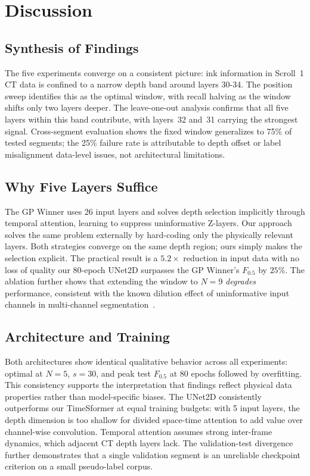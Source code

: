 \section{Discussion}
\label{sec:discussion}

\subsection{Synthesis of Findings}

The five experiments converge on a consistent picture: ink information in Scroll~1 CT data is confined to a narrow depth band around layers 30-34. The position sweep identifies this as the optimal window, with recall halving as the window shifts only two layers deeper. The leave-one-out analysis confirms that all five layers within this band contribute, with layers~32 and~31 carrying the strongest signal. Cross-segment evaluation shows the fixed window generalizes to 75\% of tested segments; the 25\% failure rate is attributable to depth offset or label misalignment data-level issues, not architectural limitations.

\subsection{Why Five Layers Suffice}

The GP Winner uses 26 input layers and solves depth selection implicitly through temporal attention, learning to suppress uninformative Z-layers. Our approach solves the same problem externally by hard-coding only the physically relevant layers. Both strategies converge on the same depth region; ours simply makes the selection explicit. The practical result is a $5.2\times$ reduction in input data with no loss of quality our 80-epoch UNet2D surpasses the GP Winner's $F_{0.5}$ by $25\%$. The ablation further shows that extending the window to $N = 9$ \emph{degrades} performance, consistent with the known dilution effect of uninformative input channels in multi-channel segmentation~\cite{roth2014new}.

\subsection{Architecture and Training}

Both architectures show identical qualitative behavior across all experiments: optimal at $N = 5$, $s = 30$, and peak test $F_{0.5}$ at 80 epochs followed by overfitting. This consistency supports the interpretation that findings reflect physical data properties rather than model-specific biases. The UNet2D consistently outperforms our TimeSformer at equal training budgets: with 5 input layers, the depth dimension is too shallow for divided space-time attention to add value over channel-wise convolution. Temporal attention assumes strong inter-frame dynamics, which adjacent CT depth layers lack. The validation-test divergence further demonstrates that a single validation segment is an unreliable checkpoint criterion on a small pseudo-label corpus.

